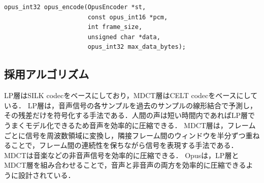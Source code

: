 \documentclass[a4paper,12pt]{article}
\begin{document}
\begin{lstlisting}
opus_int32 opus_encode(OpusEncoder *st,
                       const opus_int16 *pcm,
                       int frame_size,
                       unsigned char *data,
                       opus_int32 max_data_bytes);
\end{lstlisting}

\subsection{採用アルゴリズム}

LP層はSILK codecをベースにしており，MDCT層はCELT codecをベースにしている\cite{opus-rfc6716}．
LP層は，音声信号の各サンプルを過去のサンプルの線形結合で予測し，その残差だけを符号化する手法である．人間の声は短い時間内であればLP層でうまくモデル化できるため音声を効率的に圧縮できる．
MDCT層は，フレームごとに信号を周波数領域に変換し，隣接フレーム間のウィンドウを半分ずつ重ねることで，フレーム間の連続性を保ちながら信号を表現する手法である．MDCTは音楽などの非音声信号を効率的に圧縮できる．
Opusは，LP層とMDCT層を組み合わせることで，音声と非音声の両方を効率的に圧縮できるように設計されている\cite{opus-rfc6716}．



\end{document}
